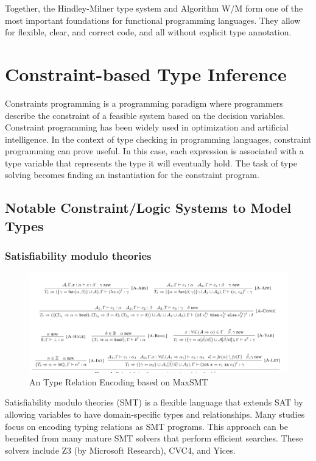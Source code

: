 Together, the Hindley-Milner type system and Algorithm W/M form one of the most important foundations for functional programming languages. They allow for flexible, clear, and correct code, and all without explicit type annotation.

\section{Constraint-based Type Inference}

Constraints programming is a programming paradigm where programmers describe the constraint of a feasible system based on the decision variables. Constraint programming has been widely used in optimization and artificial intelligence. In the context of type checking in programming languages, constraint programming can prove useful. In this case, each expression is associated with a type variable that represents the type it will eventually hold. The task of type solving becomes finding an instantiation for the constraint program.

\subsection{Notable Constraint/Logic Systems to Model Types}

\subsubsection{Satisfiability modulo theories}


\begin{figure}[hbt]
  \includegraphics[width=\linewidth]{MaxSMT}
  \caption{An Type Relation Encoding based on MaxSMT}
\end{figure}

Satisfiability modulo theories (SMT) is a flexible language that extends SAT by allowing variables to have domain-specific types and relationships. Many studies focus on encoding typing relations as SMT programs. This approach can be benefited from many mature SMT solvers that perform efficient searches. These solvers include Z3 (by Microsoft Research), CVC4, and Yices.

